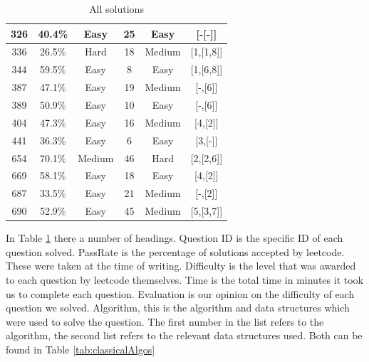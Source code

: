\documentclass[10pt,twocolumn]{IEEEtran}
\begin{document}
\begin{table}[t]
\begin{tabular}{|c| c| c| c| c| c|}
  	\hline
 	326 & 40.4\% &Easy  &25  &Easy&[-[-]]\\
   	\hline
  	336 & 26.5\% &Hard &18  &Medium&[1,[1,8]]\\
  	\hline
 	344 & 59.5\% &Easy  &8  &Easy&[1,[6,8]]\\
  	\hline
 	387 & 47.1\% &Easy  & 19 &Medium&[-,[6]]\\
  	\hline
 	389 & 50.9\% &Easy  & 10 &Easy& [-,[6]]\\
  	\hline
 	404 & 47.3\% &Easy  &16  &Medium&[4,[2]]\\
	\hline
 	441 & 36.3\% &Easy  &6&Easy &[3,[-]]\\ 	
  	\hline
 	654 & 70.1\% &Medium  &46  &Hard&[2,[2,6]]\\
  	\hline
	669 &  58.1\%& Easy &18  &Easy&[4,[2]]\\
  	\hline
	687 &  33.5\%& Easy &21  &Medium&[-,[2]]\\
  	\hline
 	690 &  52.9\%& Easy &   45&Medium&[5,[3,7]]\\[1ex]
 	\hline
\end{tabular}
\caption{All solutions}
\label{tab:tabSols}
\end{table}
\par In Table \ref{tab:tabSols} there a number of headings. Question ID is the specific ID of each question solved. PassRate is the percentage of solutions accepted by leetcode. These were taken at the time of writing. Difficulty is the level that was awarded to each question by leetcode themselves. Time is the total time in minutes it took us to complete each question. Evaluation is our opinion on the difficulty of each question we solved. Algorithm, this is the algorithm and data structures which were used to solve the question. The first number in the list refers to the algorithm, the second list refers to the relevant data structures used. Both can be found in Table {\ref{tab:classicalAlgos}}
\end{document}
